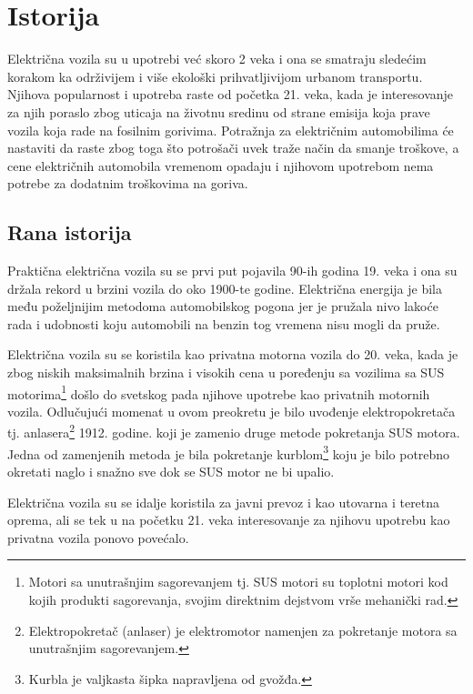 \documentclass[a4paper]{article}
\begin{document}
\section{Istorija}
\label{sec:naslov1}


Električna vozila su u upotrebi već skoro 2 veka i ona se smatraju sledećim korakom ka održivijem i više ekološki prihvatljivijom urbanom transportu. Njihova popularnost i upotreba raste od početka 21. veka, kada je interesovanje za njih poraslo zbog uticaja na životnu sredinu od strane emisija koja prave vozila koja rade na fosilnim gorivima. Potražnja za električnim automobilima će nastaviti da raste zbog toga što potrošači uvek traže način da smanje troškove, a cene električnih automobila vremenom opadaju i njihovom upotrebom nema potrebe za dodatnim troškovima na goriva.


\subsection{Rana istorija}
\label{subsec:podnaslov1}

Praktična električna vozila su se prvi put pojavila 90-ih godina 19. veka i ona su držala rekord u brzini vozila do oko 1900-te godine. Električna energija je bila među poželjnijim metodoma automobilskog pogona jer je pružala nivo lakoće rada i udobnosti koju automobili na benzin tog vremena nisu mogli da pruže.

Električna vozila su se koristila kao privatna motorna vozila do 20. veka, kada je zbog niskih maksimalnih brzina i visokih cena u poređenju sa vozilima sa SUS motorima\footnote{Motori sa unutrašnjim sagorevanjem tj. SUS motori su toplotni motori kod kojih produkti sagorevanja, svojim direktnim dejstvom vrše mehanički rad.} došlo do svetskog pada njihove upotrebe kao privatnih motornih vozila. Odlučujući momenat u ovom preokretu je bilo uvođenje elektropokretača tj. anlasera\footnote{Elektropokretač (anlaser) je elektromotor namenjen za pokretanje motora sa unutrašnjim sagorevanjem.} 1912. godine. koji je zamenio druge metode pokretanja SUS motora. Jedna od zamenjenih metoda je bila pokretanje kurblom\footnote{Kurbla je valjkasta šipka napravljena od gvožđa.} koju je bilo potrebno okretati naglo i snažno sve dok se SUS motor ne bi upalio.

Električna vozila su se idalje koristila za javni prevoz i kao utovarna i teretna oprema, ali se tek u na početku 21. veka interesovanje za njihovu upotrebu kao privatna vozila ponovo povećalo.
\end{document}
